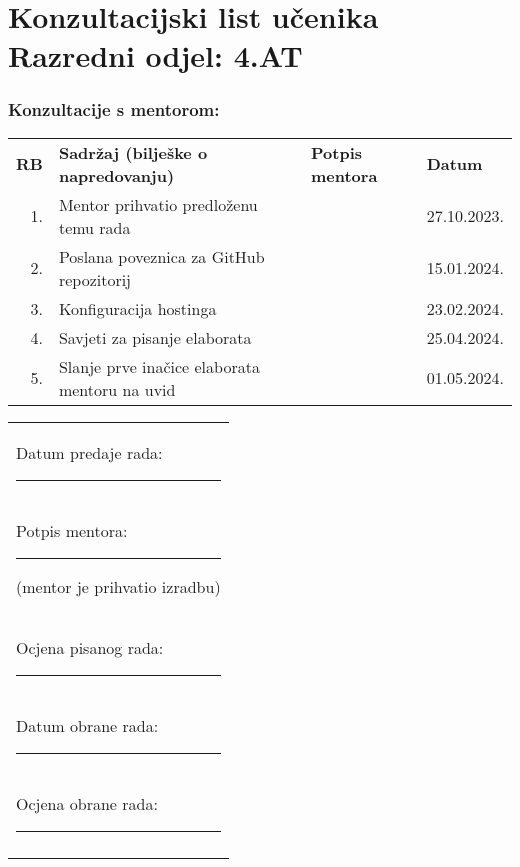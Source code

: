 \cleardoublepage
\section*{Konzultacijski list učenika \hfill Razredni odjel: 4.AT}


\begin{table}[h]
      \subsubsection*{Konzultacije s mentorom:}

      \def\arraystretch{1.6}
      \footnotesize

      \centering
      \begin{tabularx}{\textwidth}{|r|X|l|l|}
      \cline{1-4}
      \textbf{RB} & \textbf{Sadržaj (bilješke o napredovanju)} & \textbf{Potpis mentora} & \textbf{Datum} \\ \cline{1-4}
      1. & Mentor prihvatio predloženu temu rada  &                & 27.10.2023. \\ \cline{1-4}
      2. & Poslana poveznica za GitHub repozitorij  &                & 15.01.2024. \\ \cline{1-4}
      3. & Konfiguracija hostinga &                & 23.02.2024. \\ \cline{1-4}
      4. & Savjeti za pisanje elaborata  &   &  25.04.2024. \\ \cline{1-4}
      5. & Slanje prve inačice elaborata mentoru na uvid  &                &   01.05.2024.    \\ \cline{1-4}
      \end{tabularx}
    \end{table}

    \begin{center}
      \vspace{-0.5cm}
      \begin{tabular}{@{}l@{}}
        Datum predaje rada: \rule{3cm}{0.5pt} \\
        Potpis mentora: \rule{4cm}{0.5pt} \scriptsize{(mentor je prihvatio izradbu)}\normalsize \\
        Ocjena pisanog rada: \rule{4cm}{0.5pt} \\
        Datum obrane rada: \rule{3cm}{0.5pt} \\
        Ocjena obrane rada: \rule{4cm}{0.5pt} \\
        \textbf{Konačna ocjena: \rule{4cm}{0.5pt}}
        \vspace{-0.5cm}
      \end{tabular}



    \end{center}

